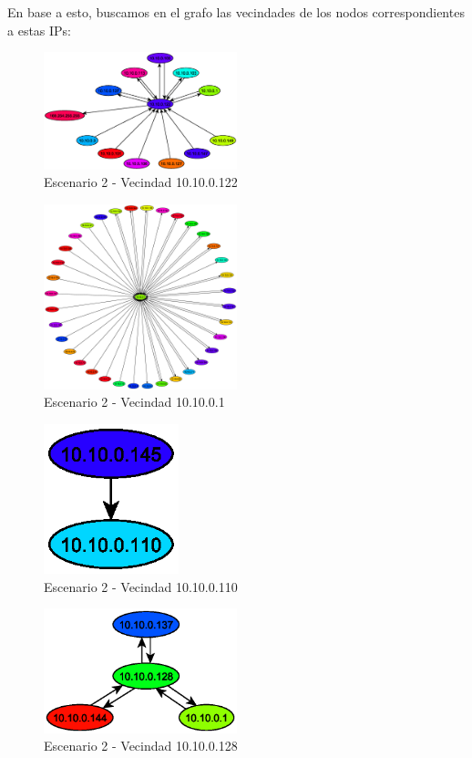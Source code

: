     En base a esto, buscamos en el grafo las vecindades de los nodos correspondientes a estas IPs:
    \begin{figure}[H]
		\centering
		\includegraphics[width=0.5\textwidth]{img/graph/escenario_2/vecindad122.eps}
		\caption{Escenario 2 - Vecindad 10.10.0.122}
		\label{fig:escenario2_vecindad122}
	\end{figure}
    \begin{figure}[H]
		\centering
		\includegraphics[width=0.5\textwidth]{img/graph/escenario_2/vecindad1.eps}
		\caption{Escenario 2 - Vecindad 10.10.0.1}
		\label{fig:escenario2_vecindad1}
	\end{figure}
    \begin{figure}[H]
		\centering
		\includegraphics[width=0.35\textwidth]{img/graph/escenario_2/vecindad110.eps}
		\caption{Escenario 2 - Vecindad 10.10.0.110}
		\label{fig:escenario2_vecindad110}
	\end{figure}
    \begin{figure}[H]
		\centering
		\includegraphics[width=0.5\textwidth]{img/graph/escenario_2/vecindad128.eps}
		\caption{Escenario 2 - Vecindad 10.10.0.128}
		\label{fig:escenario2_vecindad128}
	\end{figure}
